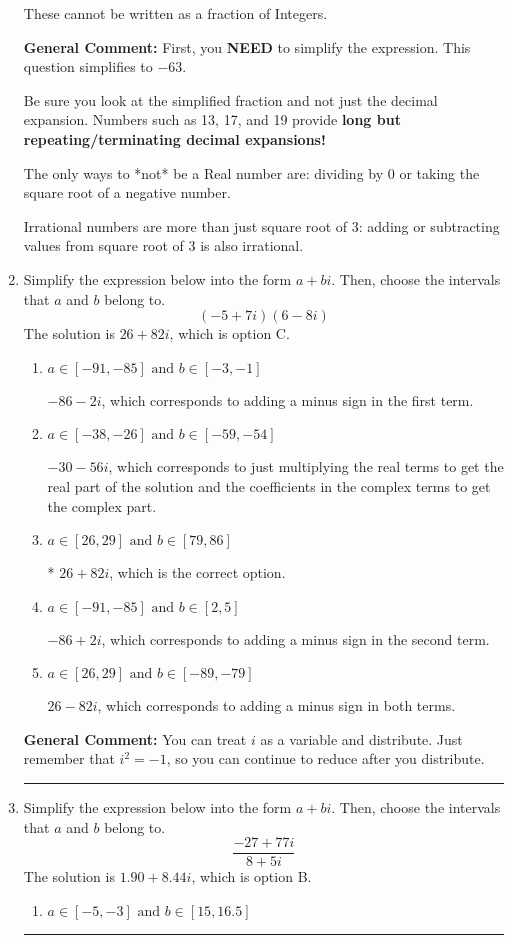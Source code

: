 \documentclass{extbook}[14pt]
\newcommand{\litem}[1]{\item #1

\rule{\textwidth}{0.4pt}}
\begin{document}
\begin{enumerate}
{\begin{enumerate}[label=\Alph*.]
These cannot be written as a fraction of Integers.
\end{enumerate}

\textbf{General Comment:} First, you \textbf{NEED} to simplify the expression. This question simplifies to $-63$. 
 
 Be sure you look at the simplified fraction and not just the decimal expansion. Numbers such as 13, 17, and 19 provide \textbf{long but repeating/terminating decimal expansions!} 
 
 The only ways to *not* be a Real number are: dividing by 0 or taking the square root of a negative number. 
 
 Irrational numbers are more than just square root of 3: adding or subtracting values from square root of 3 is also irrational.
}
\litem{
Simplify the expression below into the form $a+bi$. Then, choose the intervals that $a$ and $b$ belong to.
\[ (-5 + 7 i)(6 - 8 i) \]The solution is \( 26 + 82 i \), which is option C.\begin{enumerate}[label=\Alph*.]
\item \( a \in [-91, -85] \text{ and } b \in [-3, -1] \)

 $-86 - 2 i$, which corresponds to adding a minus sign in the first term.
\item \( a \in [-38, -26] \text{ and } b \in [-59, -54] \)

 $-30 - 56 i$, which corresponds to just multiplying the real terms to get the real part of the solution and the coefficients in the complex terms to get the complex part.
\item \( a \in [26, 29] \text{ and } b \in [79, 86] \)

* $26 + 82 i$, which is the correct option.
\item \( a \in [-91, -85] \text{ and } b \in [2, 5] \)

 $-86 + 2 i$, which corresponds to adding a minus sign in the second term.
\item \( a \in [26, 29] \text{ and } b \in [-89, -79] \)

 $26 - 82 i$, which corresponds to adding a minus sign in both terms.
\end{enumerate}

\textbf{General Comment:} You can treat $i$ as a variable and distribute. Just remember that $i^2=-1$, so you can continue to reduce after you distribute.
}
\litem{
Simplify the expression below into the form $a+bi$. Then, choose the intervals that $a$ and $b$ belong to.
\[ \frac{-27 + 77 i}{8 + 5 i} \]The solution is \( 1.90  + 8.44 i \), which is option B.\begin{enumerate}[label=\Alph*.]
\item \( a \in [-5, -3] \text{ and } b \in [15, 16.5] \)


\end{enumerate}}
\end{enumerate}
\end{document}
